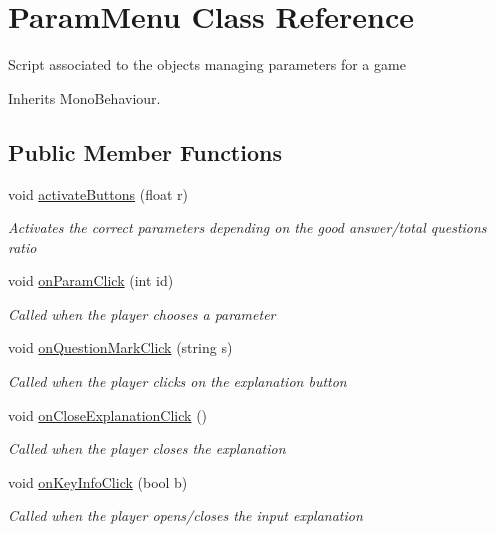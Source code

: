 \hypertarget{class_param_menu}{\section{Param\-Menu Class Reference}
\label{class_param_menu}
}


Script associated to the objects managing parameters for a game  




Inherits Mono\-Behaviour.

\subsection*{Public Member Functions}
\begin{DoxyCompactItemize}
\item 
void \hyperlink{class_param_menu_ad028d38ba147c64f567b0cbc43741310}{activate\-Buttons} (float r)
\begin{DoxyCompactList}\small\item\em Activates the correct parameters depending on the good answer/total questions ratio \end{DoxyCompactList}\item 
void \hyperlink{class_param_menu_a63f22dc8771c6c88ea2774e1a1779d81}{on\-Param\-Click} (int id)
\begin{DoxyCompactList}\small\item\em Called when the player chooses a parameter \end{DoxyCompactList}\item 
void \hyperlink{class_param_menu_a3c7b8a93dadfa18fe9647d1060e43a61}{on\-Question\-Mark\-Click} (string s)
\begin{DoxyCompactList}\small\item\em Called when the player clicks on the explanation button \end{DoxyCompactList}\item 
void \hyperlink{class_param_menu_af19f1a1956d2feda611c795d3e462d95}{on\-Close\-Explanation\-Click} ()
\begin{DoxyCompactList}\small\item\em Called when the player closes the explanation \end{DoxyCompactList}\item 
void \hyperlink{class_param_menu_a697e2fe977b12cce205de6f3c0021455}{on\-Key\-Info\-Click} (bool b)
\begin{DoxyCompactList}\small\item\em Called when the player opens/closes the input explanation \end{DoxyCompactList}\end{DoxyCompactItemize}
